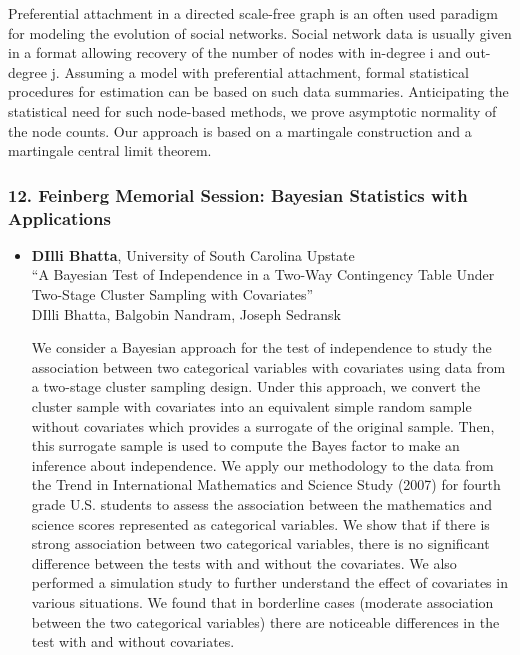 \begin{itemize}
Preferential attachment in a directed scale-free graph is an often used paradigm for modeling the evolution of social networks. Social network data is usually given in a format allowing recovery of the number of nodes with in-degree i and out-degree j. Assuming a model with preferential attachment, formal statistical procedures for estimation can be based on such data summaries. Anticipating the statistical need for such node-based methods, we prove asymptotic normality of the node counts. Our approach is based on a martingale construction and a martingale central limit theorem.

\end{itemize}

\subsubsection*{12. Feinberg Memorial Session: Bayesian Statistics with Applications}

\begin{itemize}
\item \textbf{DIlli Bhatta}, University of South Carolina Upstate \\
``A Bayesian Test of Independence in a Two-Way  Contingency Table  Under Two-Stage Cluster Sampling with Covariates'' \\
DIlli Bhatta, Balgobin Nandram, Joseph Sedransk


We consider a Bayesian approach for the test of independence to study the association between two categorical variables with covariates using data from a two-stage cluster sampling design. Under this approach, we convert the cluster sample with covariates into an equivalent simple random sample without covariates which provides a surrogate of the original sample. Then, this surrogate sample is used to compute the Bayes factor to make an inference about independence.
We apply our methodology to the data from the Trend in International Mathematics and Science Study (2007) for fourth grade U.S. students to assess the association between the mathematics and science scores represented as categorical variables. 
We show that if there is strong association between two categorical variables, there is no significant difference between the tests with and without the covariates. We also performed a simulation study to further understand the effect of covariates in various situations. We found that in borderline cases (moderate association between the two categorical variables) there are noticeable differences in the test with and without covariates. 

\end{itemize}

